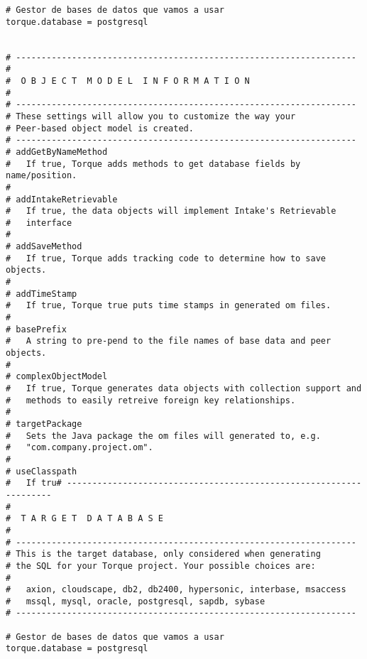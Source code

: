 \begin{lstlisting}
# Gestor de bases de datos que vamos a usar
torque.database = postgresql


# -------------------------------------------------------------------
#
#  O B J E C T  M O D E L  I N F O R M A T I O N
#
# -------------------------------------------------------------------
# These settings will allow you to customize the way your
# Peer-based object model is created.
# -------------------------------------------------------------------
# addGetByNameMethod
#   If true, Torque adds methods to get database fields by name/position.
#
# addIntakeRetrievable
#   If true, the data objects will implement Intake's Retrievable
#   interface
#
# addSaveMethod
#   If true, Torque adds tracking code to determine how to save objects.
#
# addTimeStamp
#   If true, Torque true puts time stamps in generated om files.
#
# basePrefix
#   A string to pre-pend to the file names of base data and peer objects.
#
# complexObjectModel
#   If true, Torque generates data objects with collection support and
#   methods to easily retreive foreign key relationships.
#
# targetPackage
#   Sets the Java package the om files will generated to, e.g.
#   "com.company.project.om".
#
# useClasspath
#   If tru# -------------------------------------------------------------------
#
#  T A R G E T  D A T A B A S E
#
# -------------------------------------------------------------------
# This is the target database, only considered when generating
# the SQL for your Torque project. Your possible choices are:
#
#   axion, cloudscape, db2, db2400, hypersonic, interbase, msaccess
#   mssql, mysql, oracle, postgresql, sapdb, sybase
# -------------------------------------------------------------------

# Gestor de bases de datos que vamos a usar
torque.database = postgresql



\end{lstlisting}
